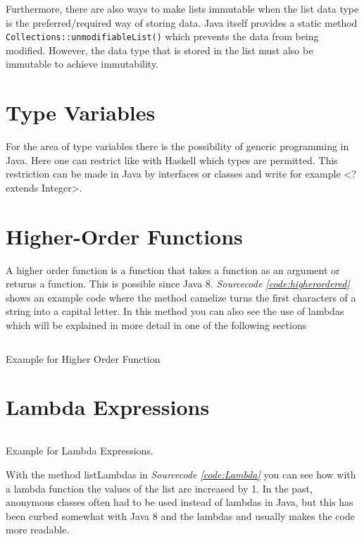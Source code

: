 \documentclass[a4paper,12pt,twoside]{scrreprt}
\begin{document}
\medskip

Furthermore, there are also ways to make lists immutable when the list data type is the preferred/required way of storing data. Java itself provides a static method \texttt{Collections::unmodifiableList()} which prevents the data from being modified. However, the data type that is stored in the list must also be immutable to achieve immutability.

\section{Type Variables}
For the area of type variables there is the possibility of generic programming in Java. Here one can restrict like with Haskell which types are permitted. This restriction can be made in Java by interfaces or classes and write for example <? extends Integer>.
\section{Higher-Order Functions}
A higher order function is a function that takes a function as an argument or returns a function. This is possible since Java 8. \emph{Sourcecode \ref{code:higherordered}} shows an example code where the method camelize turns the first characters of a string into a capital letter. In this method you can also see the use of lambdas which will be explained in more detail in one of the following sections
\begin{listing}[ht]
    \inputminted[fontsize=\footnotesize,linenos,breaklines]{java}{./code/HigherOrderFunctions.java}
    \caption[Example for Higher Order Function]{Example for Higher Order Function}
    \label{code:higherordered}
\end{listing}
\clearpage

\section{Lambda Expressions}
\begin{listing}[ht]
    \inputminted[fontsize=\footnotesize,linenos]{java}{./code/Lambda.java}
    \caption[Example for Lambda]{Example for Lambda Expressions.}
    \label{code:Lambda}
\end{listing}
With the method listLambdas in \emph{Sourcecode \ref{code:Lambda}} you can see how with a lambda function the values of the list are increased by 1. In the past, anonymous classes often had to be used instead of lambdas in Java, but this has been curbed somewhat with Java 8 and the lambdas and usually makes the code more readable.
\clearpage
\end{document}
